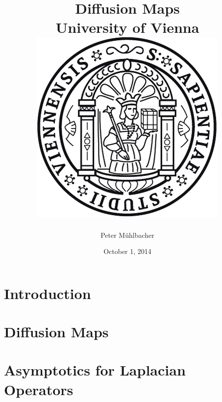 \documentclass[11pt]{report}
\begin{document}
\title{
	{Diffusion Maps}\\
	{\large University of Vienna}\\
	{\includegraphics{university.png}}
}
\author{Peter Mühlbacher}
\date{October 1, 2014}
\maketitle

\begin{abstract}
\end{abstract}

\tableofcontents

\chapter*{Introduction}


\chapter{Diffusion Maps}


%

\appendix
\chapter{Asymptotics for Laplacian Operators}

%



\end{document}
